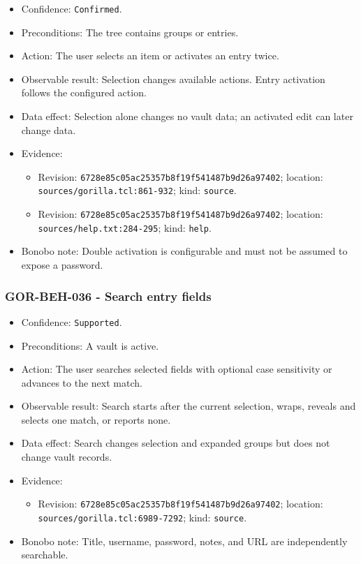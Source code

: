 \documentclass[
  letterpaper,
]{article}
\newcommand{\passthrough}[1]{#1}
\providecommand{\tightlist}{%
  \setlength{\itemsep}{0pt}\setlength{\parskip}{0pt}}
\begin{document}
\begin{itemize}
\tightlist
\item
  Confidence: \passthrough{\lstinline!Confirmed!}.
\item
  Preconditions: The tree contains groups or entries.
\item
  Action: The user selects an item or activates an entry twice.
\item
  Observable result: Selection changes available actions. Entry activation follows the configured action.
\item
  Data effect: Selection alone changes no vault data; an activated edit can later change data.
\item
  Evidence:

  \begin{itemize}
  \tightlist
  \item
    Revision: \nolinkurl{6728e85c05ac25357b8f19f541487b9d26a97402}; location: \nolinkurl{sources/gorilla.tcl:861-932};
    kind: \passthrough{\lstinline!source!}.
  \item
    Revision: \nolinkurl{6728e85c05ac25357b8f19f541487b9d26a97402}; location: \nolinkurl{sources/help.txt:284-295};
    kind: \passthrough{\lstinline!help!}.
  \end{itemize}
\item
  Bonobo note: Double activation is configurable and must not be assumed to expose a password.
\end{itemize}

\subsubsection{GOR-BEH-036 - Search entry fields}\label{gor-beh-036---search-entry-fields}

\begin{itemize}
\tightlist
\item
  Confidence: \passthrough{\lstinline!Supported!}.
\item
  Preconditions: A vault is active.
\item
  Action: The user searches selected fields with optional case sensitivity or advances to the next match.
\item
  Observable result: Search starts after the current selection, wraps, reveals and selects one match, or reports none.
\item
  Data effect: Search changes selection and expanded groups but does not change vault records.
\item
  Evidence:

  \begin{itemize}
  \tightlist
  \item
    Revision: \nolinkurl{6728e85c05ac25357b8f19f541487b9d26a97402}; location: \nolinkurl{sources/gorilla.tcl:6989-7292};
    kind: \passthrough{\lstinline!source!}.
  \end{itemize}
\item
  Bonobo note: Title, username, password, notes, and URL are independently searchable.
\end{itemize}
\end{document}
